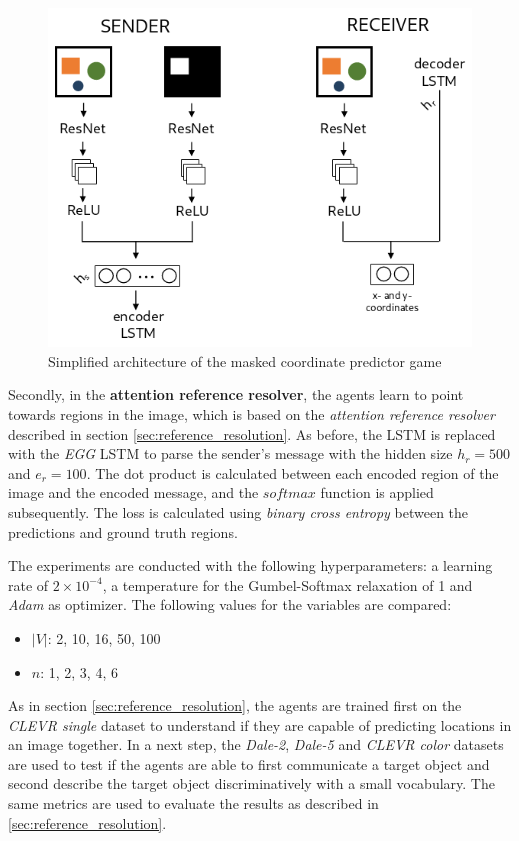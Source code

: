 \begin{figure}[ht]
    \centering
    \includegraphics[width=.7\linewidth]{figures/arch_coordinate_predictor_game.png}
    \caption{Simplified architecture of the masked coordinate predictor game}
    \label{fig:coordinate_predictor_game_architecture}
\end{figure}

Secondly, in the \textbf{attention reference resolver}, the agents learn to point towards regions in the image, which is based on the \emph{attention reference resolver} described in section \ref{sec:reference_resolution}.
As before, the LSTM is replaced with the \emph{EGG} LSTM to parse the sender's message with the hidden size $h_r=500$ and $e_r=100$.
The dot product is calculated between each encoded region of the image and the encoded message, and the $softmax$ function is applied subsequently.
The loss is calculated using \emph{binary cross entropy} between the predictions and ground truth regions.


The experiments are conducted with the following hyperparameters: a learning rate of $2\times10^{-4}$, a temperature for the Gumbel-Softmax relaxation of 1 and \emph{Adam} \citep{Kingma2015} as optimizer.
The following values for the variables are compared:
\begin{itemize}
    \item $|V|$: 2, 10, 16, 50, 100
    \item $n$: 1, 2, 3, 4,  6
\end{itemize}

As in section \ref{sec:reference_resolution}, the agents are trained first on the \emph{CLEVR single} dataset to understand if they are capable of predicting locations in an image together.
In a next step, the \emph{Dale-2}, \emph{Dale-5} and \emph{CLEVR color} datasets are used to test if the agents are able to first communicate a target object and second describe the target object discriminatively with a small vocabulary.
The same metrics are used to evaluate the results as described in \ref{sec:reference_resolution}.

